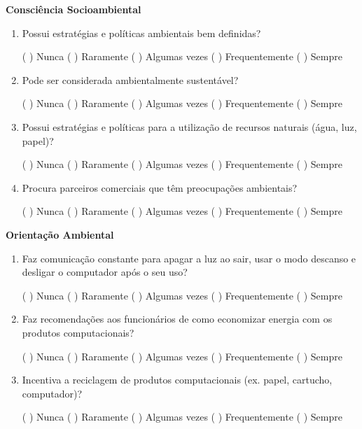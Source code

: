 \begin{apendicesenv}
\textbf{Consciência Socioambiental}

\begin{enumerate}
    \item Possui estratégias e políticas ambientais bem definidas? 
    
    ( \space\space ) Nunca  ( \space\space ) Raramente  ( \space\space ) Algumas vezes  ( \space\space ) Frequentemente ( \space\space ) Sempre
    \item Pode ser considerada ambientalmente sustentável? 
    
    ( \space\space ) Nunca  ( \space\space ) Raramente  ( \space\space ) Algumas vezes  ( \space\space ) Frequentemente ( \space\space ) Sempre
    \item Possui estratégias e políticas para a utilização de recursos naturais (água, luz, papel)? 
    
    ( \space\space ) Nunca  ( \space\space ) Raramente  ( \space\space ) Algumas vezes  ( \space\space ) Frequentemente ( \space\space ) Sempre
    \item Procura parceiros comerciais que têm preocupações ambientais? 
    
    ( \space\space ) Nunca  ( \space\space ) Raramente  ( \space\space ) Algumas vezes  ( \space\space ) Frequentemente ( \space\space ) Sempre
\end{enumerate}
    
\textbf{Orientação Ambiental}

\begin{enumerate}
    \item Faz comunicação constante para apagar a luz ao sair, usar o modo descanso e desligar o computador após o seu uso? 
    
    ( \space\space ) Nunca  ( \space\space ) Raramente  ( \space\space ) Algumas vezes  ( \space\space ) Frequentemente ( \space\space ) Sempre
    \item Faz recomendações aos funcionários de como economizar energia com os produtos computacionais? 
    
    ( \space\space ) Nunca  ( \space\space ) Raramente  ( \space\space ) Algumas vezes  ( \space\space ) Frequentemente ( \space\space ) Sempre
    \item Incentiva a reciclagem de produtos computacionais (ex. papel, cartucho, computador)? 
    
    ( \space\space ) Nunca  ( \space\space ) Raramente  ( \space\space ) Algumas vezes  ( \space\space ) Frequentemente ( \space\space ) Sempre
\end{enumerate}


\end{apendicesenv}
